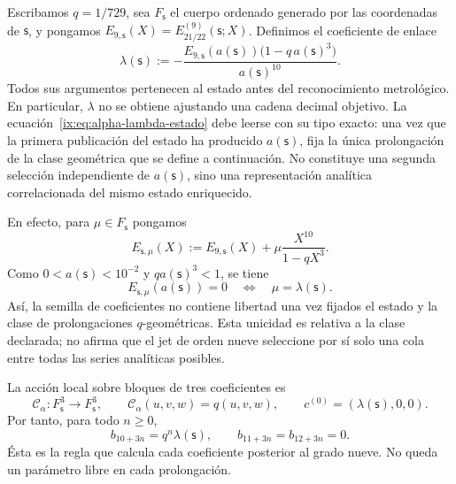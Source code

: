 Escribamos \(q=1/729\), sea \(F_{\mathsf s}\) el cuerpo ordenado generado por
las coordenadas de \(\mathsf s\), y pongamos
\(E_{9,\mathsf s}(X)=E_{21/22}^{(9)}(\mathsf s;X)\). Definimos el coeficiente
de enlace
\begin{equation}
 \lambda(\mathsf s):=
 -\frac{E_{9,\mathsf s}(a(\mathsf s))
         \bigl(1-q\,a(\mathsf s)^3\bigr)}{a(\mathsf s)^{10}}.
 \label{ix:eq:alpha-lambda-estado}
\end{equation}
Todos sus argumentos pertenecen al estado antes del reconocimiento
metrológico. En particular, \(\lambda\) no se obtiene ajustando una cadena
decimal objetivo. La ecuación~\eqref{ix:eq:alpha-lambda-estado} debe leerse con
su tipo exacto: una vez que la primera publicación del estado ha producido
\(a(\mathsf s)\), fija la única prolongación de la clase geométrica que se
define a continuación. No constituye una segunda selección independiente de
\(a(\mathsf s)\), sino una representación analítica correlacionada del mismo
estado enriquecido.

En efecto, para \(\mu\in F_{\mathsf s}\) pongamos
\[
 E_{\mathsf s,\mu}(X)
 :=E_{9,\mathsf s}(X)+\mu\frac{X^{10}}{1-qX^3}.
\]
Como \(0<a(\mathsf s)<10^{-2}\) y \(qa(\mathsf s)^3<1\), se tiene
\begin{equation}
 E_{\mathsf s,\mu}(a(\mathsf s))=0
 \quad\Longleftrightarrow\quad
 \mu=\lambda(\mathsf s).
 \label{ix:eq:alpha-unicidad-lambda-clase-geometrica}
\end{equation}
Así, la semilla de coeficientes no contiene libertad una vez fijados el estado
y la clase de prolongaciones \(q\)-geométricas. Esta unicidad es relativa a la
clase declarada; no afirma que el jet de orden nueve seleccione por sí solo una
cola entre todas las series analíticas posibles.

La acción local sobre bloques de tres coeficientes es
\begin{equation}
 \mathcal C_\alpha:F_{\mathsf s}^{3}\longrightarrow F_{\mathsf s}^{3},
 \qquad \mathcal C_\alpha(u,v,w)=q(u,v,w),
 \qquad c^{(0)}=(\lambda(\mathsf s),0,0).
 \label{ix:eq:alpha-accion-coeficientes}
\end{equation}
Por tanto, para todo \(n\geq0\),
\begin{equation}
 b_{10+3n}=q^n\lambda(\mathsf s),\qquad
 b_{11+3n}=b_{12+3n}=0.
 \label{ix:eq:alpha-recurrencia-coeficientes}
\end{equation}
Ésta es la regla que calcula cada coeficiente posterior al grado nueve. No
queda un parámetro libre en cada prolongación.

